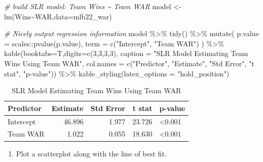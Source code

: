 \documentclass[
  11pt,
]{book}
\newenvironment{Shaded}{\begin{snugshade}}{\end{snugshade}}
\newcommand{\AttributeTok}[1]{\textcolor[rgb]{0.77,0.63,0.00}{#1}}
\newcommand{\CommentTok}[1]{\textcolor[rgb]{0.56,0.35,0.01}{\textit{#1}}}
\newcommand{\DecValTok}[1]{\textcolor[rgb]{0.00,0.00,0.81}{#1}}
\newcommand{\FunctionTok}[1]{\textcolor[rgb]{0.00,0.00,0.00}{#1}}
\newcommand{\NormalTok}[1]{#1}
\newcommand{\OtherTok}[1]{\textcolor[rgb]{0.56,0.35,0.01}{#1}}
\newcommand{\SpecialCharTok}[1]{\textcolor[rgb]{0.00,0.00,0.00}{#1}}
\newcommand{\StringTok}[1]{\textcolor[rgb]{0.31,0.60,0.02}{#1}}
\providecommand{\tightlist}{%
  \setlength{\itemsep}{0pt}\setlength{\parskip}{0pt}}
\theoremstyle{definition}
\theoremstyle{definition}
\theoremstyle{definition}
\theoremstyle{definition}
\theoremstyle{remark}
\begin{document}
\begin{Shaded}
\begin{Highlighting}[]
\CommentTok{\# build SLR model: Team Wins \textasciitilde{} Team WAR}
\NormalTok{model }\OtherTok{\textless{}{-}} \FunctionTok{lm}\NormalTok{(Wins}\SpecialCharTok{\textasciitilde{}}\NormalTok{WAR,}\AttributeTok{data=}\NormalTok{mlb22\_war)}

\CommentTok{\# Nicely output regression information}
\NormalTok{model }\SpecialCharTok{\%\textgreater{}\%} \FunctionTok{tidy}\NormalTok{() }\SpecialCharTok{\%\textgreater{}\%}
  \FunctionTok{mutate}\NormalTok{(}
    \AttributeTok{p.value =}\NormalTok{ scales}\SpecialCharTok{::}\FunctionTok{pvalue}\NormalTok{(p.value),}
    \AttributeTok{term =} \FunctionTok{c}\NormalTok{(}\StringTok{"Intercept"}\NormalTok{, }\StringTok{"Team WAR"}\NormalTok{)}
\NormalTok{  ) }\SpecialCharTok{\%\textgreater{}\%}
  \FunctionTok{kable}\NormalTok{(}\AttributeTok{booktabs=}\NormalTok{T,}\AttributeTok{digits=}\FunctionTok{c}\NormalTok{(}\DecValTok{3}\NormalTok{,}\DecValTok{3}\NormalTok{,}\DecValTok{3}\NormalTok{,}\DecValTok{3}\NormalTok{), }
        \AttributeTok{caption =} \StringTok{"SLR Model Estimating Team Wins Using Team WAR"}\NormalTok{,}
        \AttributeTok{col.names =} \FunctionTok{c}\NormalTok{(}\StringTok{"Predictor"}\NormalTok{, }\StringTok{"Estimate"}\NormalTok{, }\StringTok{"Std Error"}\NormalTok{, }\StringTok{"t stat"}\NormalTok{, }\StringTok{"p{-}value"}\NormalTok{)) }\SpecialCharTok{\%\textgreater{}\%}
  \FunctionTok{kable\_styling}\NormalTok{(}\AttributeTok{latex\_options =} \StringTok{"hold\_position"}\NormalTok{)}
\end{Highlighting}
\end{Shaded}

\begin{table}[!h]

\caption{\label{tab:unnamed-chunk-231}SLR Model Estimating Team Wins Using Team WAR}
\centering
\begin{tabular}[t]{lrrrl}
\toprule
Predictor & Estimate & Std Error & t stat & p-value\\
\midrule
Intercept & 46.896 & 1.977 & 23.726 & <0.001\\
Team WAR & 1.022 & 0.055 & 18.630 & <0.001\\
\bottomrule
\end{tabular}
\end{table}

\newpage

\begin{enumerate}
\def\labelenumi{(\alph{enumi})}
\setcounter{enumi}{2}
\tightlist
\item
  Plot a scatterplot along with the line of best fit.
\end{enumerate}
\end{document}
